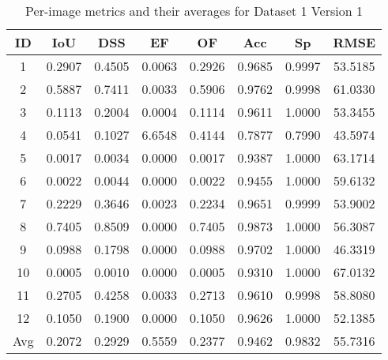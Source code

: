 \documentclass[12pt]{article}
\begin{document}
\begin{table}[h]
\centering
\begin{tabular}{|c|c|c|c|c|c|c|c|}
\hline
ID & IoU & DSS & EF & OF & Acc & Sp & RMSE \\
\hline
1 & 0.2907 & 0.4505 & 0.0063 & 0.2926 & 0.9685 & 0.9997 & 53.5185 \\
2 & 0.5887 & 0.7411 & 0.0033 & 0.5906 & 0.9762 & 0.9998 & 61.0330 \\
3 & 0.1113 & 0.2004 & 0.0004 & 0.1114 & 0.9611 & 1.0000 & 53.3455 \\
4 & 0.0541 & 0.1027 & 6.6548 & 0.4144 & 0.7877 & 0.7990 & 43.5974 \\
5 & 0.0017 & 0.0034 & 0.0000 & 0.0017 & 0.9387 & 1.0000 & 63.1714 \\
6 & 0.0022 & 0.0044 & 0.0000 & 0.0022 & 0.9455 & 1.0000 & 59.6132 \\
7 & 0.2229 & 0.3646 & 0.0023 & 0.2234 & 0.9651 & 0.9999 & 53.9002 \\
8 & 0.7405 & 0.8509 & 0.0000 & 0.7405 & 0.9873 & 1.0000 & 56.3087 \\
9 & 0.0988 & 0.1798 & 0.0000 & 0.0988 & 0.9702 & 1.0000 & 46.3319 \\
10 & 0.0005 & 0.0010 & 0.0000 & 0.0005 & 0.9310 & 1.0000 & 67.0132 \\
11 & 0.2705 & 0.4258 & 0.0033 & 0.2713 & 0.9610 & 0.9998 & 58.8080 \\
12 & 0.1050 & 0.1900 & 0.0000 & 0.1050 & 0.9626 & 1.0000 & 52.1385 \\
\hline
Avg & 0.2072 & 0.2929 & 0.5559 & 0.2377 & 0.9462 & 0.9832 & 55.7316 \\
\hline
\end{tabular}
\caption{Per-image metrics and their averages for Dataset 1 Version 1}
\end{table}
\end{document}
